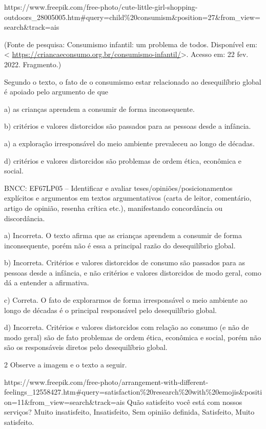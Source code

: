 {https://www.freepik.com/free-photo/cute-little-girl-shopping-outdoors\_28005005.htm\#query=child\%20consumism\&position=27\&from\_view=search\&track=ais

(Fonte de pesquisa: Consumismo infantil: um problema de todos.
Disponível em: \textless{}
\url{https://criancaeconsumo.org.br/consumismo-infantil/}\textgreater.
Acesso em: 22 fev. 2022. Fragmento.)

Segundo o texto, o fato de o consumismo estar relacionado ao
desequilíbrio global é apoiado pelo argumento de que

a) as crianças aprendem a consumir de forma inconsequente.

b) critérios e valores distorcidos são passados para as pessoas desde a
infância.

a) a exploração irresponsável do meio ambiente prevaleceu ao longo de
décadas.

d) critérios e valores distorcidos são problemas de ordem ética,
econômica e social.

BNCC: EF67LP05 -- Identificar e avaliar teses/opiniões/posicionamentos
explícitos e argumentos em textos argumentativos (carta de leitor,
comentário, artigo de opinião, resenha crítica etc.), manifestando
concordância ou discordância.

a) Incorreta. O texto afirma que as crianças aprendem a consumir de
forma inconsequente, porém não é essa a principal razão do desequilíbrio
global.

b) Incorreta. Critérios e valores distorcidos de consumo são passados
para as pessoas desde a infância, e não critérios e valores distorcidos
de modo geral, como dá a entender a afirmativa.

c) Correta. O fato de explorarmos de forma irresponsável o meio ambiente
ao longo de décadas é o principal responsável pelo desequilíbrio global.

d) Incorreta. Critérios e valores distorcidos com relação ao consumo (e
não de modo geral) são de fato problemas de ordem ética, econômica e
social, porém não são os responsáveis diretos pelo desequilíbrio global.

\num{2} Observe a imagem e o texto a seguir.

https://www.freepik.com/free-photo/arrangement-with-different-feelings\_12558427.htm\#query=satisfaction\%20research\%20with\%20emojis\&position=11\&from\_view=search\&track=ais
Quão satisfeito você está com nossos serviços? Muito insatisfeito,
Insatisfeito, Sem opinião definida, Satisfeito, Muito satisfeito.

}
